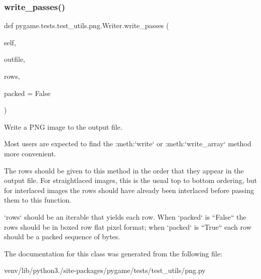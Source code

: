\subsubsection{\texorpdfstring{write\+\_\+passes()}{write\_passes()}}
{\footnotesize\ttfamily def pygame.\+tests.\+test\+\_\+utils.\+png.\+Writer.\+write\+\_\+passes (\begin{DoxyParamCaption}\item[{}]{self,  }\item[{}]{outfile,  }\item[{}]{rows,  }\item[{}]{packed = {\ttfamily False} }\end{DoxyParamCaption})}

\begin{DoxyVerb}Write a PNG image to the output file.

Most users are expected to find the :meth:`write` or
:meth:`write_array` method more convenient.

The rows should be given to this method in the order that
they appear in the output file.  For straightlaced images,
this is the usual top to bottom ordering, but for interlaced
images the rows should have already been interlaced before
passing them to this function.

`rows` should be an iterable that yields each row.  When
`packed` is ``False`` the rows should be in boxed row flat pixel
format; when `packed` is ``True`` each row should be a packed
sequence of bytes.\end{DoxyVerb}
 

The documentation for this class was generated from the following file\+:\begin{DoxyCompactItemize}
\item 
venv/lib/python3./site-\/packages/pygame/tests/test\+\_\+utils/png.\+py\end{DoxyCompactItemize}
